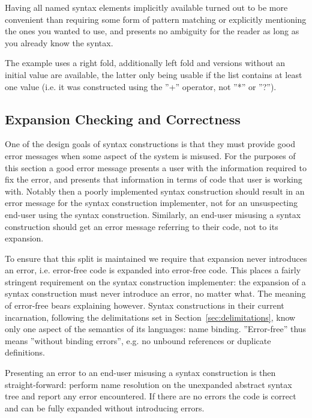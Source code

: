 \documentclass{kththesis}
\begin{document}
Having all named syntax elements implicitly available turned out to be more convenient than requiring some form of pattern matching or explicitly mentioning the ones you wanted to use, and presents no ambiguity for the reader as long as you already know the syntax.

The example uses a right fold, additionally left fold and versions without an initial value are available, the latter only being usable if the list contains at least one value (i.e. it was constructed using the ''+'' operator, not ''*'' or ''?'').

\subsection{Expansion Checking and Correctness} \label{sec:expansion-checking}

One of the design goals of syntax constructions is that they must provide good error messages when some aspect of the system is misused. For the purposes of this section a good error message presents a user with the information required to fix the error, and presents that information in terms of code that user is working with. Notably then a poorly implemented syntax construction should result in an error message for the syntax construction implementer, not for an unsuspecting end-user using the syntax construction. Similarly, an end-user misusing a syntax construction should get an error message referring to their code, not to its expansion.

To ensure that this split is maintained we require that expansion never introduces an error, i.e. error-free code is expanded into error-free code. This places a fairly stringent requirement on the syntax construction implementer: the expansion of a syntax construction must never introduce an error, no matter what. The meaning of error-free bears explaining however. Syntax constructions in their current incarnation, following the delimitations set in Section~\ref{sec:delimitations}, know only one aspect of the semantics of its languages: name binding. ''Error-free'' thus means ''without binding errors'', e.g. no unbound references or duplicate definitions.

Presenting an error to an end-user misusing a syntax construction is then straight-forward: perform name resolution on the unexpanded abstract syntax tree and report any error encountered. If there are no errors the code is correct and can be fully expanded without introducing errors.
\end{document}
